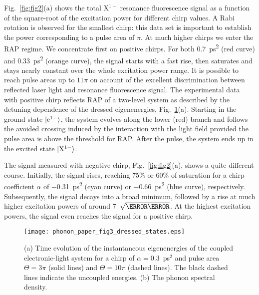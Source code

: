 \documentclass[aps,prl,reprint,superscriptaddress]{revtex4-1}
\begin{document}
Fig.~\ref{fig:fig2}(a) shows the total $\mathrm{X}^{1-}$ resonance fluorescence signal as a function of the square-root of the excitation power for different chirp values. A Rabi rotation is observed for the smallest chirp: this data set is important to establish the power corresponding to a pulse area of $\pi$. At much higher chirps we enter the RAP regime. We concentrate first on positive chirps. For both \SI{+0.7}{\pico\second\squared} (red curve) and \SI{+0.33}{\pico\second\squared} (orange curve), the signal starts with a fast rise, then saturates and stays nearly constant over the whole excitation power range. It is possible to reach pulse areas up to $11\pi$ on account of the excellent discrimination between reflected laser light and resonance fluorescence signal. The experimental data with positive chirp reflects RAP of a two-level system as described by the detuning dependence of the dressed eigenenergies, Fig.\ \ref{fig:dressed}(a). Starting in the ground state $\ket{\mathrm{e}^{1-}}$, the system evolves along the lower (red) branch and follows the avoided crossing induced by the interaction with the light field provided the pulse area is above the threshold for RAP. After the pulse, the system ends up in the excited state $\ket{\mathrm{X}^{1-}}$. 

The signal measured with negative chirp, Fig.~\ref{fig:fig2}(a), shows a quite different course. Initially, the signal rises, reaching 75\% or 60\% of saturation for a chirp coefficient $\alpha$ of \SI{-0.31}{\pico\second\squared} (cyan curve) or \SI{-0.66}{\pico\second\squared} (blue curve), respectively. Subsequently, the signal decays into a broad minimum, followed by a rise at much higher excitation powers of around \SI{7}{\ensuremath{\sqrt{\micro\watt}}}. At the highest excitation powers, the signal even reaches the signal for a positive chirp. 

\begin{figure}[t]{}
	\centering
	\texttt{[image: phonon\_paper\_fig3\_dressed\_states.eps]}
	\caption{(a) Time evolution of the instantaneous eigenenergies of the coupled electronic-light system for a chirp of $\alpha=0.3$~ps$^2$ and pulse area $\Theta=3\pi$ (solid lines) and $\Theta=10\pi$ (dashed lines). The black dashed lines indicate the uncoupled energies. (b) The phonon spectral density.
	}
	\label{fig:dressed}
\end{figure}
\end{document}
